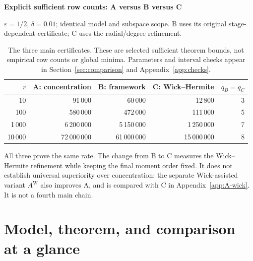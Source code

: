 \documentclass[11pt]{article}
\numberwithin{equation}{section}
\theoremstyle{definition}\newtheorem{definition}[theorem]{Definition}
\theoremstyle{remark}\newtheorem{remark}[theorem]{Remark}
\begin{document}
\vspace{3mm}
{\sffamily\bfseries\color{Navy}Explicit sufficient row counts: A versus B versus C\par}
{\small $\varepsilon=1/2$, $\delta=0.01$; identical model and subspace scope.
B uses its original stage-dependent certificate; C uses the radial/degree refinement.}
\begin{table}[H]\centering\small
\setlength{\tabcolsep}{10pt}\renewcommand{\arraystretch}{1.18}
\begin{tabular}{@{}rrrrr@{}}
\toprule
$r$&\textbf{A: concentration}&\textbf{B: framework}&\textbf{C: Wick--Hermite}&$q_B=q_C$\\
\midrule
10&91\,000&60\,000&12\,800&3\\
100&580\,000&472\,000&111\,000&5\\
1\,000&6\,200\,000&5\,150\,000&1\,250\,000&7\\
10\,000&72\,000\,000&61\,000\,000&15\,000\,000&8\\
\bottomrule
\end{tabular}
\caption{The three main certificates. These are selected sufficient theorem bounds,
not empirical row counts or global minima. Parameters and interval checks appear in
Section~\ref{sec:comparison} and Appendix~\ref{app:checks}.}
\label{tab:three-main-counts}
\end{table}

\begin{takeaway}[title={What this comparison means},top=5pt,bottom=5pt]
\small
All three prove the same rate. The change from B to C measures the Wick--Hermite
refinement while keeping the final moment order fixed. It does not establish
universal superiority over concentration: the separate Wick-assisted variant
$A^{\mathrm W}$ also improves A, and is compared with C in
Appendix~\ref{app:A-wick}. It is not a fourth main chain.
\end{takeaway}
\clearpage
\section{Model, theorem, and comparison at a glance}\label{sec:model}
\end{document}
